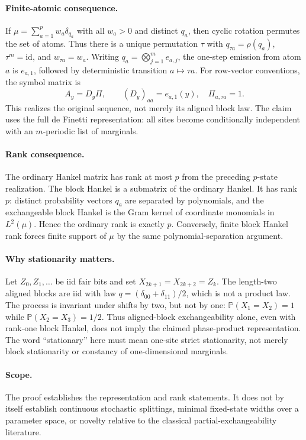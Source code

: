 \paragraph{Finite-atomic consequence.}
If $\mu=\sum_{a=1}^p w_a\delta_{q_a}$ with all $w_a>0$ and distinct
$q_a$, then cyclic rotation permutes the set of atoms. Thus there is a
unique permutation $\tau$ with $q_{\tau a}=\rho(q_a)$,
$\tau^m=\mathrm{id}$, and $w_{\tau a}=w_a$.
Writing $q_a=\bigotimes_{j=1}^m e_{a,j}$, the one-step emission from atom
$a$ is $e_{a,1}$, followed by deterministic transition $a\mapsto\tau a$.
For row-vector conventions, the symbol matrix is
\[
 A_y=D_y\Pi,\qquad
 (D_y)_{aa}=e_{a,1}(y),\quad
 \Pi_{a,\tau a}=1.
\]
This realizes the original sequence, not merely its aligned block law.
The claim uses the full de Finetti representation: all sites become
conditionally independent with an $m$-periodic list of marginals.

\paragraph{Rank consequence.}
The ordinary Hankel matrix has rank at most $p$ from the preceding
$p$-state realization. The block Hankel is a submatrix of the ordinary
Hankel. It has rank $p$: distinct probability vectors $q_a$ are separated
by polynomials, and the exchangeable block Hankel is the Gram kernel of
coordinate monomials in $L^2(\mu)$. Hence the ordinary rank is exactly $p$.
Conversely, finite block Hankel rank forces finite support of $\mu$ by
the same polynomial-separation argument.

\paragraph{Why stationarity matters.}
Let $Z_0,Z_1,\ldots$ be iid fair bits and set
$X_{2k+1}=X_{2k+2}=Z_k$. The length-two aligned blocks are iid with law
$q=(\delta_{00}+\delta_{11})/2$, which is not a product law.
The process is invariant under shifts by two, but not by one:
$\mathbb P(X_1=X_2)=1$ while $\mathbb P(X_2=X_3)=1/2$.
Thus aligned-block exchangeability alone, even with rank-one block
Hankel, does not imply the claimed phase-product representation.
The word ``stationary'' here must mean one-site strict stationarity,
not merely block stationarity or constancy of one-dimensional marginals.

\paragraph{Scope.}
The proof establishes the representation and rank statements. It does
not by itself establish continuous stochastic splittings, minimal
fixed-state widths over a parameter space, or novelty relative to the
classical partial-exchangeability literature.

